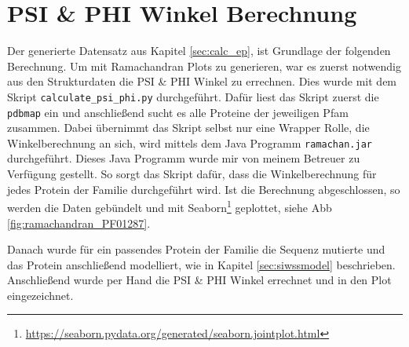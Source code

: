 \newpage
\section{PSI \& PHI Winkel Berechnung}
Der generierte Datensatz aus Kapitel \ref{sec:calc_ep}, ist Grundlage der folgenden Berechnung. Um mit Ramachandran Plots zu generieren, war es zuerst notwendig aus den Strukturdaten die PSI \& PHI Winkel zu errechnen. Dies wurde mit dem Skript \texttt{calculate\_psi\_phi.py} durchgeführt. Dafür liest das Skript zuerst die \texttt{pdbmap} ein und anschließend sucht es alle Proteine der jeweiligen Pfam zusammen. Dabei übernimmt das Skript selbst nur eine Wrapper Rolle, die Winkelberechnung an sich, wird mittels dem Java Programm \texttt{ramachan.jar} durchgeführt. Dieses Java Programm wurde mir von meinem Betreuer zu Verfügung gestellt. So sorgt das Skript dafür, dass die Winkelberechnung für jedes Protein der Familie durchgeführt wird. Ist die Berechnung abgeschlossen, so werden die Daten gebündelt und mit Seaborn\footnote{\url{https://seaborn.pydata.org/generated/seaborn.jointplot.html}} geplottet, siehe \ac{Abb} \ref{fig:ramachandran_PF01287}. 

Danach wurde für ein passendes Protein der Familie die Sequenz mutierte und das Protein anschließend modelliert, wie in Kapitel \ref{sec:siwssmodel} beschrieben. Anschließend wurde per Hand die PSI \& PHI Winkel errechnet und in den Plot eingezeichnet.





